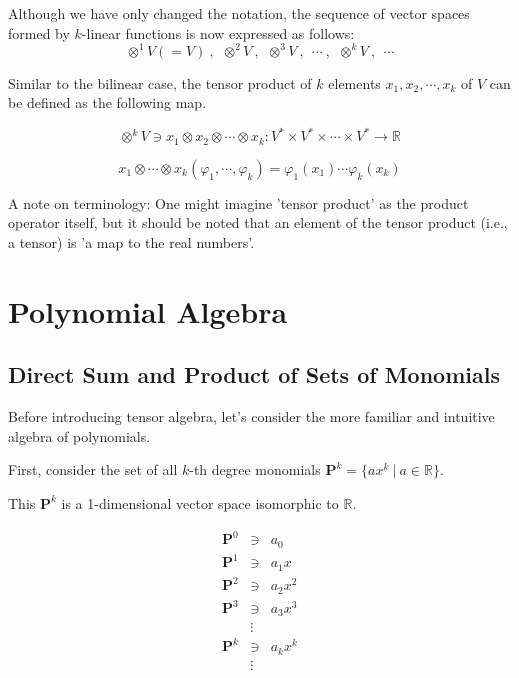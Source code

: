 \documentclass[uplatex,a4j,12pt,dvipdfmx]{jsarticle}
\begin{document}
Although we have only changed the notation, the sequence of vector spaces formed by $k$-linear functions is now expressed as follows:
$$
	\otimes^{1} V (= V) \ , \ \ \otimes^{2} V \ , \ \ \otimes^{3} V \ , \ \ \cdots \ , \ \ \otimes^{k} V \ , \ \ \cdots
$$

Similar to the bilinear case,
the tensor product of $k$ elements $x_{1}, x_{2} , \cdots , x_{k}$ of $V$ can be defined as the following map.

$$ \otimes^{k} V \ni x_{1} \otimes x_{2} \otimes \cdots \otimes x_{k}: V^* \times V^* \times \cdots \times V^* \to \mathbb{R}$$

$$
	x_{1} \otimes \cdots \otimes x_{k} ( \varphi_{1} , \cdots, \varphi_{k})
	=
	\varphi_{1} (x_{1}) \cdots \varphi_{k} (x_{k})
$$

A note on terminology:
One might imagine 'tensor product' as the product operator itself, but it should be noted that an element of the tensor product (i.e., a tensor) is 'a map to the real numbers'.

\section{Polynomial Algebra}

\subsection{Direct Sum and Product of Sets of Monomials}

Before introducing tensor algebra, let's consider the more familiar and intuitive algebra of polynomials.

First, consider the set of all $k$-th degree monomials $\mathbf{P}^{k} = \{ ax^{k} \ | \ a \in \mathbb{R} \}$.

This $\mathbf{P}^{k}$ is a 1-dimensional vector space isomorphic to $\mathbb{R}$.

\[
	\begin{array}{rcl}
		\mathbf{P}^{0} & \ni    & a_{0}       \\
		\mathbf{P}^{1} & \ni    & a_{1} x     \\
		\mathbf{P}^{2} & \ni    & a_{2} x^{2} \\
		\mathbf{P}^{3} & \ni    & a_{3} x^{3} \\
		               & \vdots &             \\
		\mathbf{P}^{k} & \ni    & a_{k} x^{k} \\
		               & \vdots &             \\
	\end{array}
\]
\end{document}
